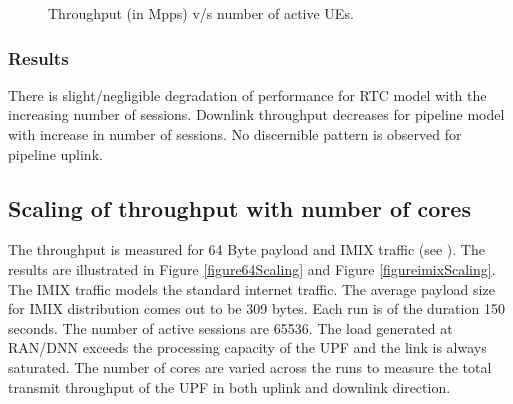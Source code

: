 \begin{figure}[htbp]
    \centering
    
    \caption{ Throughput (in Mpps) v/s number of active UEs. }
        \label{figureUEs}
\end{figure}

\subsubsection{Results}
There is slight/negligible degradation of performance for RTC model with the increasing number of sessions. Downlink throughput decreases for pipeline model with increase in number of sessions. No discernible pattern is observed for pipeline uplink. 

\subsection{Scaling of throughput with number of cores \label{subsectionThroughputScaling}}

The throughput is measured for 64 Byte payload and IMIX traffic (see \cite{imixLink}). The
 results are illustrated in Figure \ref{figure64Scaling} and Figure \ref{figureimixScaling}. The IMIX traffic models the standard internet traffic. The average payload size for IMIX distribution comes out to be 309 bytes. Each run is of the duration 150 seconds. The number of active sessions are 65536. The load generated at RAN/DNN exceeds the processing capacity of the UPF and the link is always saturated. The number of cores are varied across the runs to measure the total transmit throughput of the UPF in both uplink and downlink direction. 
 
